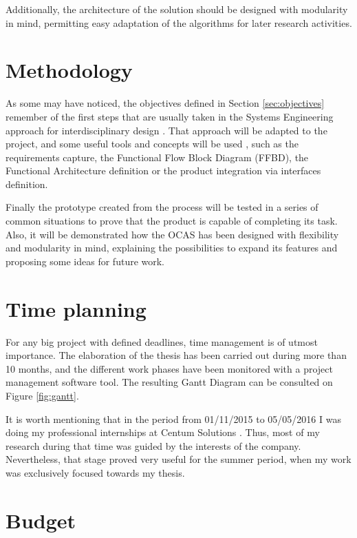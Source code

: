 Additionally, the architecture of the solution should be designed with modularity in mind, permitting easy adaptation of the algorithms for later research activities.

\section{Methodology}

As some may have noticed, the objectives defined in Section \ref{sec:objectives} remember of the first steps that are usually taken in the Systems Engineering approach for interdisciplinary design \cite{whatissystemsengineering}.
That approach will be adapted to the project, and some useful tools and concepts will be used \cite{nationalaeronauticsandspaceadministration2007}, such as the requirements capture, the Functional Flow Block Diagram (FFBD), the Functional Architecture definition or the product integration via interfaces definition.

Finally the prototype created from the process will be tested in a series of common situations to prove that the product is capable of completing its task.
Also, it will be demonstrated how the OCAS has been designed with flexibility and modularity in mind, explaining the possibilities to expand its features and proposing some ideas for future work.

\section{Time planning}

For any big project with defined deadlines, time management is of utmost importance.
The elaboration of the thesis has been carried out during more than 10 months, and the different work phases have been monitored with a project management software tool.
The resulting Gantt Diagram can be consulted on Figure \ref{fig:gantt}.



It is worth mentioning that in the period from 01/11/2015 to 05/05/2016 I was doing my professional internships at Centum Solutions \cite{melgosa2016}.
Thus, most of my research during that time was guided by the interests of the company.
Nevertheless, that stage proved very useful for the summer period, when my work was exclusively focused towards my thesis.

\section{Budget}

